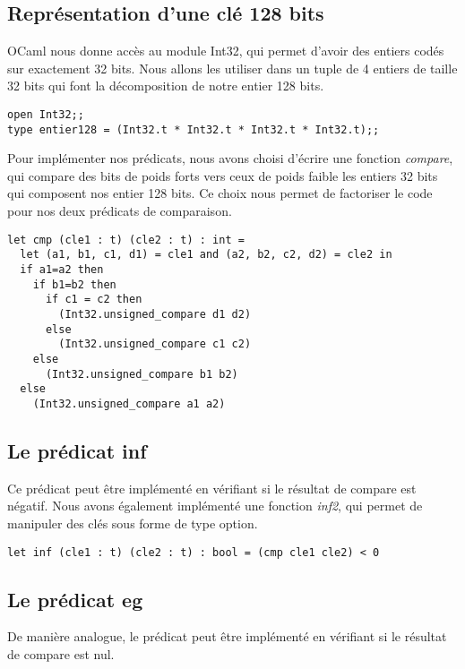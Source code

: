 \documentclass[12pt,a4paper]{article}
\begin{document}
\subsection{Représentation d'une clé 128 bits}

OCaml nous donne accès au module Int32, qui permet d'avoir des entiers codés sur exactement 32 bits. Nous allons les utiliser dans un tuple de 4 entiers de taille 32 bits qui font la décomposition de notre entier 128 bits.

\medskip

\begin{lstlisting}
open Int32;;
type entier128 = (Int32.t * Int32.t * Int32.t * Int32.t);;

\end{lstlisting} \medskip


Pour implémenter nos prédicats, nous avons choisi d'écrire une fonction \textit{compare}, qui compare des bits de poids forts vers ceux de poids faible les entiers 32 bits qui composent nos entier 128 bits. Ce choix nous permet de factoriser le code pour nos deux prédicats de comparaison.

\medskip \begin{lstlisting}
let cmp (cle1 : t) (cle2 : t) : int = 
  let (a1, b1, c1, d1) = cle1 and (a2, b2, c2, d2) = cle2 in 
  if a1=a2 then 
    if b1=b2 then 
      if c1 = c2 then
        (Int32.unsigned_compare d1 d2)
      else
        (Int32.unsigned_compare c1 c2)
    else
      (Int32.unsigned_compare b1 b2) 
  else 
    (Int32.unsigned_compare a1 a2)
\end{lstlisting} 

\subsection{Le prédicat inf}

Ce prédicat peut être implémenté en vérifiant si le résultat de compare est négatif. Nous avons également implémenté une fonction \textit{inf2}, qui permet de manipuler des clés sous forme de type option.

\medskip \begin{lstlisting}
let inf (cle1 : t) (cle2 : t) : bool = (cmp cle1 cle2) < 0
\end{lstlisting} 

\subsection{Le prédicat eg}
De manière analogue, le prédicat peut être implémenté en vérifiant si le résultat de compare est nul.
\end{document}
